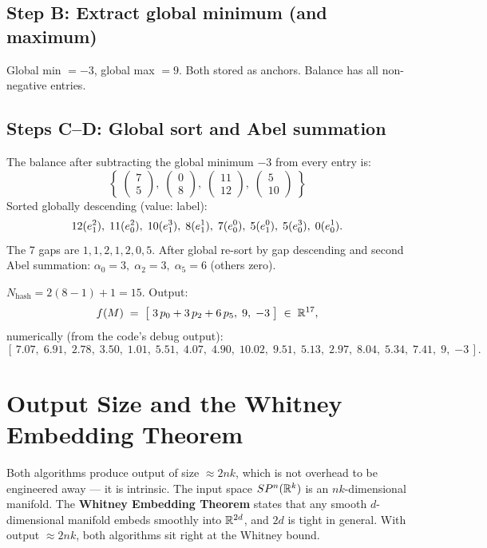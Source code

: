 \subsection*{Step B: Extract global minimum (and maximum)}

Global min $= -3$, global max $= 9$.  Both stored as anchors.  Balance has
all non-negative entries.

\subsection*{Steps C--D: Global sort and Abel summation}

The balance after subtracting the global minimum $-3$ from every entry is:
\[
  \left\{\;\begin{pmatrix}7\\5\end{pmatrix},\;
            \begin{pmatrix}0\\8\end{pmatrix},\;
            \begin{pmatrix}11\\12\end{pmatrix},\;
            \begin{pmatrix}5\\10\end{pmatrix}\;\right\}
\]
Sorted globally descending (value: label):
\[
  12(e^{2}_{1}),\;11(e^{2}_{0}),\;10(e^{3}_{1}),\;8(e^{1}_{1}),\;
  7(e^{0}_{0}),\;5(e^{0}_{1}),\;5(e^{3}_{0}),\;0(e^{1}_{0}).
\]
The 7 gaps are $1,1,2,1,2,0,5$.  After global re-sort by gap descending and
second Abel summation: $\alpha_0=3,\;\alpha_2=3,\;\alpha_5=6$ (others zero).

$N_{\text{hash}} = 2(8{-}1){+}1 = 15$. Output:
\[
  f(M) \;=\;
  \bigl[\;3\,p_0 + 3\,p_2 + 6\,p_5,\;9,\;{-3}\;\bigr]
  \;\in\; \mathbb{R}^{17},
\]
numerically (from the code's debug output):
\[
  [\,7.07,\;6.91,\;2.78,\;3.50,\;1.01,\;5.51,\;4.07,\;4.90,\;10.02,\;
   9.51,\;5.13,\;2.97,\;8.04,\;5.34,\;7.41,\;9,\;{-3}\,].
\]

\section{Output Size and the Whitney Embedding Theorem}
\label{sec:whitney}

Both algorithms produce output of size $\approx 2nk$, which is not overhead to
be engineered away — it is intrinsic.  The input space $SP^{n}(\mathbb{R}^{k})$ is an
$nk$-dimensional manifold.  The \textbf{Whitney Embedding Theorem} states that
any smooth $d$-dimensional manifold embeds smoothly into $\mathbb{R}^{2d}$, and $2d$
is tight in general.  With output $\approx 2nk$, both algorithms sit right at
the Whitney bound.

